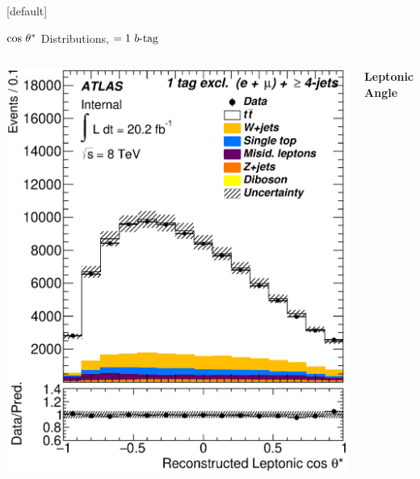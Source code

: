 \documentclass{beamer}
\begin{document}
{  \makeatletter %
  [default]
  \def\beamer@entrycode{\vspace*{-1.075\headheight}}
  \begin{frame}{$\lowercase{\text{cos}}~\theta^*$ Distributions, $=1\text{ } \lowercase{ b\text{-tag}}$}
    \begin{columns}
      \includegraphics[width=\textwidth]{../chapters/whel/figures/control_Plots2/elmu_1excl_LH48/CosTheta_reco_lep_elmu}\\
      \vspace{-10pt}\begin{center}\textbf{Leptonic Angle}\end{center}

\end{columns}
\end{frame}}
\end{document}

